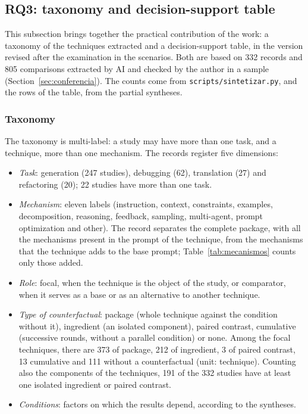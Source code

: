 \subsection{RQ3: taxonomy and decision-support table}\label{sec:qp3}

This subsection brings together the practical contribution of the work: a taxonomy of the techniques
extracted and a decision-support table, in the version revised after the examination in the scenarios. Both are based on 332 records
and 805 comparisons extracted by AI and checked by the author in a sample (Section~\ref{sec:conferencia}). The counts come from
\texttt{scripts/sintetizar.py}, and the rows of the table, from the partial syntheses.

\subsubsection{Taxonomy}

The taxonomy is multi-label: a study may have more than one task, and a technique, more
than one mechanism. The records register five dimensions:
\begin{itemize}
  \item \textit{Task}: generation (247 studies), debugging (62), translation (27) and
    refactoring (20); 22 studies have more than one task.
  \item \textit{Mechanism}: eleven labels (instruction, context, constraints, examples,
    decomposition, reasoning, feedback, sampling, multi-agent, prompt optimization and
    other). The record separates the complete package, with all the mechanisms present in the prompt
    of the technique, from the mechanisms that the technique adds to the base prompt;
    Table~\ref{tab:mecanismos} counts only those added.
  \item \textit{Role}: focal, when the technique is the object of the study, or comparator, when
    it serves as a base or as an alternative to another technique.
  \item \textit{Type of counterfactual}: package (whole technique against the condition without
    it), ingredient (an isolated component), paired contrast, cumulative (successive
    rounds, without a parallel condition) or none. Among the focal techniques, there are 373 of
    package, 212 of ingredient, 3 of paired contrast, 13 cumulative and 111 without a
    counterfactual (unit: technique). Counting also the components of the techniques, 191 of the
    332 studies have at least one isolated ingredient or paired contrast.
  \item \textit{Conditions}: factors on which the results depend, according to the syntheses.
\end{itemize}


